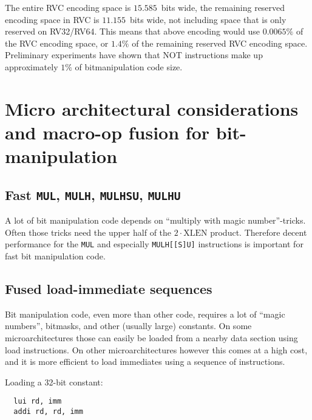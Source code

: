 

The entire RVC encoding space is $15.585$~bits wide, the remaining reserved
encoding space in RVC is $11.155$~bits wide, not including space that is only
reserved on RV32/RV64. This means that above encoding would use $0.0065\%$ of
the RVC encoding space, or $1.4\%$ of the remaining reserved RVC encoding
space. Preliminary experiments have shown that NOT instructions make up
approximately $1\%$ of bitmanipulation code size.~\cite{Wolf17A}


\section{Micro architectural considerations and macro-op fusion for bit-manipulation}


\subsection{Fast {\tt MUL}, {\tt MULH}, {\tt MULHSU}, {\tt MULHU}}

A lot of bit manipulation code depends on ``multiply with magic number''-tricks. Often those
tricks need the upper half of the $2 \cdot \textrm{XLEN}$ product. Therefore decent performance
for the \texttt{MUL} and especially \texttt{MULH[[S]U]} instructions is important for fast
bit manipulation code.


\subsection{Fused load-immediate sequences}

Bit manipulation code, even more than other code, requires a lot of ``magic numbers'',
bitmasks, and other (usually large) constants. On some microarchitectures those
can easily be loaded from a nearby data section using load instructions. On other
microarchitectures however this comes at a high cost, and it is more efficient
to load immediates using a sequence of instructions.

Loading a 32-bit constant:

\begin{minipage}{\linewidth}
\begin{verbatim}
  lui rd, imm
  addi rd, rd, imm
\end{verbatim}
\end{minipage}

